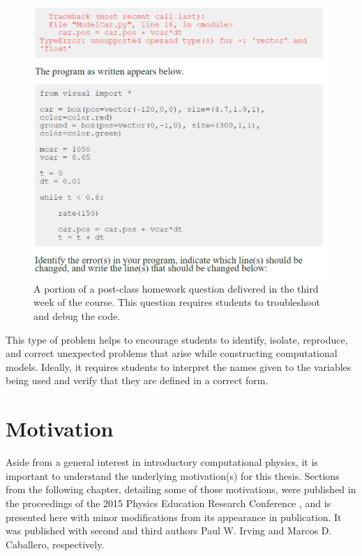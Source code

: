 \documentclass{msuphddissertation}
\begin{document}
\begin{doublespace}
\begin{figure}[ht]\centering
\includegraphics[scale=0.50]{images/CH3PostClassHomework.pdf}
\caption{A portion of a post-class homework question delivered in the third week of the course.  This question requires students to troubleshoot and debug the code.}\label{CH3:PostClassHomework}
\end{figure}

This type of problem helps to encourage students to identify, isolate, reproduce, and correct unexpected problems that arise while constructing computational models.  Ideally, it requires students to interpret the names given to the variables being used and verify that they are defined in a correct form.  %

%
%
%
%
%
%
%
%
%
%
%
%
%
%
%
%

\chapter{Motivation}\label{CH4:Motivation}

Aside from a general interest in introductory computational physics, it is important to understand the underlying motivation(s) for this thesis.  Sections from the following chapter, detailing some of those motivations, were published in the proceedings of the 2015 Physics Education Research Conference \cite{AAPT2016}, and is presented here with minor modifications from its appearance in publication. It was published with second and third authors Paul W. Irving and Marcos D. Caballero, respectively.


\end{doublespace}
\end{document}
